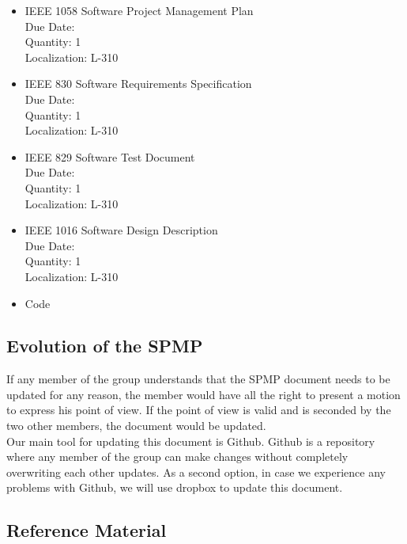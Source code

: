 \begin{itemize}
  \item IEEE 1058 Software Project Management Plan\\
            Due Date: \\
            Quantity: 1\\
            Localization: L-310 
  \item IEEE 830 Software Requirements Specification\\
            Due Date: \\
            Quantity: 1\\
            Localization: L-310 
  \item IEEE 829 Software Test Document \\
            Due Date: \\
            Quantity: 1\\
            Localization: L-310

  \item IEEE 1016 Software Design Description\\ 
            Due Date:\\
            Quantity: 1\\
            Localization: L-310 
  \item Code
\end{itemize}

\subsection{Evolution of the SPMP}

If any member of the group understands that the SPMP document needs to be updated for any reason, the member would have all the right to present a motion to express his point of view.  If the point of view is valid and is seconded by the two other members, the document would be updated.\\

Our main tool for updating this document is Github. Github is a repository where any member of the group can make changes without completely overwriting each other updates. As a second option, in case we experience any problems with Github, we will use dropbox to update this document.


\subsection{Reference Material}

